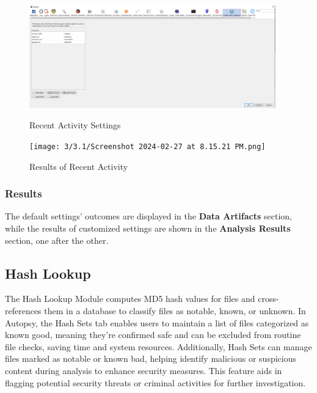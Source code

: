 \documentclass{article}
\begin{document}
\begin{figure}[h]
\centering
\begin{minipage}{0.5\textwidth}
  \centering
  \begin{center}
    \includegraphics[width=0.95\textwidth]{3/3.1/recent activity settings.PNG}
\end{center}
  \caption{Recent Activity Settings}
\end{minipage}
\hfill
\begin{minipage}{0.45\textwidth}
  \centering
  \begin{center}
    \texttt{[image: 3/3.1/Screenshot 2024-02-27 at 8.15.21 PM.png]}
    \caption{Results of Recent Activity}
\end{center}
\end{minipage}
\end{figure}

\subsubsection*{Results}
The default settings' outcomes are displayed in the \textbf{Data Artifacts} section, while the results of customized settings are shown in the \textbf{Analysis Results } section, one after the other.

\subsection{Hash Lookup}
The Hash Lookup Module computes MD5 hash values for files and cross-references them in a database to classify files as notable, known, or unknown. In Autopsy, the Hash Sets tab enables users to maintain a list of files categorized as known good, meaning they're confirmed safe and can be excluded from routine file checks, saving time and system resources. Additionally, Hash Sets can manage files marked as notable or known bad, helping identify malicious or suspicious content during analysis to enhance security measures. This feature aids in flagging potential security threats or criminal activities for further investigation.
\end{document}
